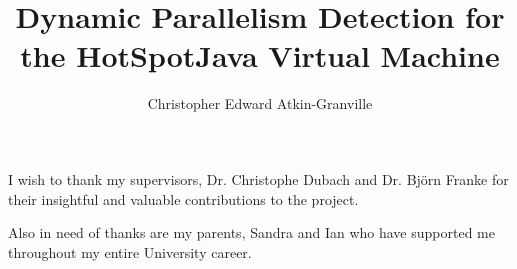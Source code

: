 \documentclass[msc,cs,parskip,leftchapter,logo,twoside,abbrevs,11pt]{infthesis}
\title{Dynamic Parallelism Detection for the HotSpot\texttrademark Java Virtual Machine}
\author{Christopher Edward Atkin-Granville}
\begin{document}
	\begin{preliminary}
		\maketitle
		\begin{acknowledgements}
		I wish to thank my supervisors, Dr. Christophe Dubach and Dr. Bj\"{o}rn Franke for their insightful and valuable contributions to the project.

		Also in need of thanks are my parents, Sandra and Ian who have supported me throughout my entire University career.
		\end{acknowledgements}
		\standarddeclaration
		\dedication{To my grandfather, Leslie.}
		\tableofcontents
		\listoffigures
	\end{preliminary}

	
	
	
	
	
	
	
	
	

	
	
\end{document}
